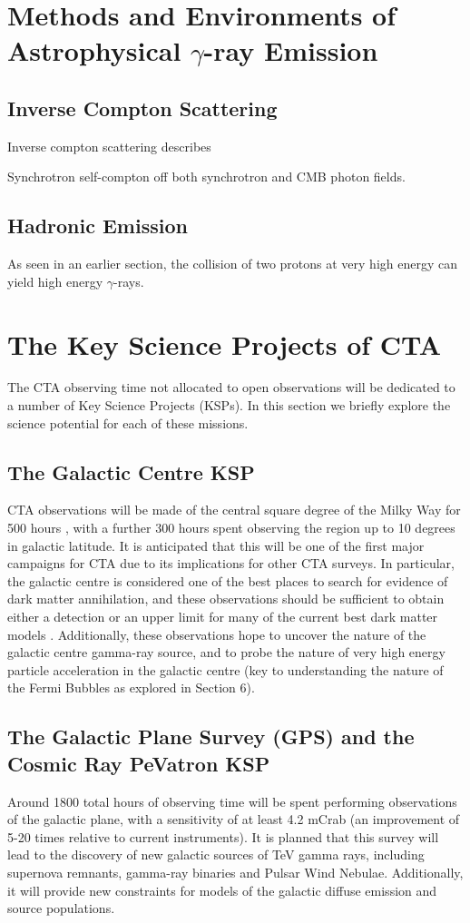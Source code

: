 \section{Methods and Environments of Astrophysical $\gamma$-ray Emission}
\subsection{Inverse Compton Scattering}

Inverse compton scattering describes 

Synchrotron self-compton off both synchrotron and CMB photon fields.

\subsection{Hadronic Emission}
As seen in an earlier section, the collision of two protons at very high energy can yield high energy $\gamma$-rays.


\section{The Key Science Projects of CTA}
The CTA observing time not allocated to open observations will be dedicated to a number of Key Science Projects (KSPs). In this section we briefly explore the science potential for each of these missions.

\subsection{The Galactic Centre KSP}
CTA observations will be made of the central square degree of the Milky Way for 500 hours \cite{scienceCTA}, with a further 300 hours spent observing the region up to 10 degrees in galactic latitude. It is anticipated that this will be one of the first major campaigns for CTA due to its implications for other CTA surveys.
In particular, the galactic centre is considered one of the best places to search for evidence of dark matter annihilation, and these observations should be sufficient to obtain either a detection or an upper limit for many of the current best dark matter models \cite{scienceCTA}. Additionally, these observations hope to uncover the nature of the galactic centre gamma-ray source, and to probe the nature of very high energy particle acceleration in the galactic centre (key to understanding the nature of the Fermi Bubbles as explored in Section 6). 

\subsection{The Galactic Plane Survey (GPS) and the Cosmic Ray PeVatron KSP}
Around 1800 total hours of observing time will be spent performing observations of the galactic plane, with a sensitivity of at least 4.2 mCrab \cite{scienceCTA} (an improvement of 5-20 times relative to current instruments). It is planned that this survey will lead to the discovery of new galactic sources of TeV gamma rays, including supernova remnants, gamma-ray binaries and Pulsar Wind Nebulae. Additionally, it will provide new constraints for models of the galactic diffuse emission and source populations. 

